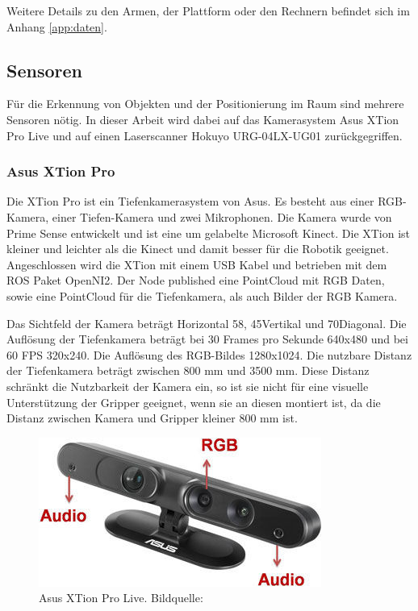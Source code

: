Weitere Details zu den Armen, der Plattform oder den Rechnern befindet sich im Anhang \ref{app:daten}.

\subsection{Sensoren}
\label{sec:aufbau-sensoren}
Für die Erkennung von Objekten und der Positionierung im Raum sind mehrere Sensoren nötig. In dieser Arbeit wird dabei auf das Kamerasystem Asus XTion Pro Live und auf einen Laserscanner Hokuyo URG-04LX-UG01 zurückgegriffen.

\subsubsection{Asus XTion Pro}
Die XTion Pro ist ein Tiefenkamerasystem von Asus. Es besteht aus einer RGB-Kamera, einer Tiefen-Kamera und zwei Mikrophonen. Die Kamera wurde von Prime Sense entwickelt und ist eine um gelabelte Microsoft Kinect. Die XTion ist kleiner und leichter als die Kinect und damit besser für die Robotik geeignet. Angeschlossen wird die XTion mit einem USB Kabel und betrieben mit dem ROS Paket OpenNI2. Der Node published eine PointCloud mit RGB Daten, sowie eine PointCloud für die Tiefenkamera, als auch Bilder der RGB Kamera.

Das Sichtfeld der Kamera beträgt Horizontal 58\textdegree, 45\textdegree Vertikal und 70\textdegree Diagonal. Die Auflösung der Tiefenkamera beträgt bei 30 Frames pro Sekunde 640x480 und bei 60 FPS 320x240. Die Auflösung des RGB-Bildes 1280x1024. Die nutzbare Distanz der Tiefenkamera beträgt zwischen 800 mm und 3500 mm.\cite{asus2015} Diese Distanz schränkt die Nutzbarkeit der Kamera ein, so ist sie nicht für eine visuelle Unterstützung der Gripper geeignet, wenn sie an diesen montiert ist, da die Distanz zwischen Kamera und Gripper kleiner 800 mm ist.

\begin{figure}[H]
	\centering
	\includegraphics[scale=0.8]{fig/xtion1}   
	\caption[Asus Xtion Pro Live]{Asus XTion Pro Live. Bildquelle: \cite{asus2015}}
	\label{fig:aufbau-xtion}
\end{figure}

